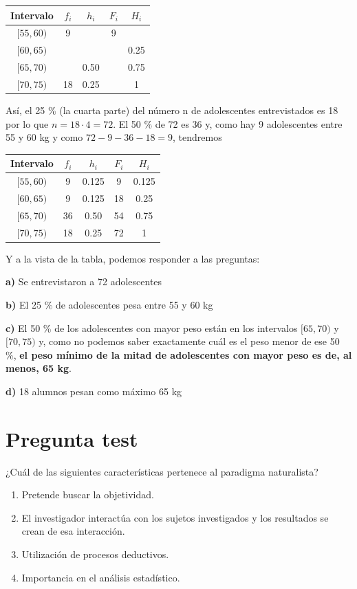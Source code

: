 \documentclass[
]{book}
\providecommand{\tightlist}{%
  \setlength{\itemsep}{0pt}\setlength{\parskip}{0pt}}
\begin{document}
\begin{longtable}[]{@{}ccccc@{}}
\toprule
Intervalo & \(f_i\) & \(h_i\) & \(F_i\) & \(H_i\)\tabularnewline
\midrule
\endhead
\([55,60)\) & 9 & & 9 &\tabularnewline
\([60,65)\) & & & & 0.25\tabularnewline
\([65,70)\) & & 0.50 & & 0.75\tabularnewline
\([70,75)\) & 18 & 0.25 & & 1\tabularnewline
\bottomrule
\end{longtable}

Así, el 25 \% (la cuarta parte) del número n de adolescentes entrevistados es 18 por lo que \(n = 18 \cdot 4 = 72\). El 50 \% de 72 es 36 y, como hay 9 adolescentes entre 55 y 60 kg y como \(72 - 9 - 36 - 18 = 9\), tendremos

\begin{longtable}[]{@{}ccccc@{}}
\toprule
Intervalo & \(f_i\) & \(h_i\) & \(F_i\) & \(H_i\)\tabularnewline
\midrule
\endhead
\([55,60)\) & 9 & 0.125 & 9 & 0.125\tabularnewline
\([60,65)\) & 9 & 0.125 & 18 & 0.25\tabularnewline
\([65,70)\) & 36 & 0.50 & 54 & 0.75\tabularnewline
\([70,75)\) & 18 & 0.25 & 72 & 1\tabularnewline
\bottomrule
\end{longtable}

Y a la vista de la tabla, podemos responder a las preguntas:

\textbf{a)} Se entrevistaron a 72 adolescentes

\textbf{b)} El 25 \% de adolescentes pesa entre 55 y 60 kg

\textbf{c)} El 50 \% de los adolescentes con mayor peso están en los intervalos \([65,70)\) y \([70,75)\) y, como no podemos saber exactamente cuál es el peso menor de ese 50 \%, \textbf{el peso mínimo de la mitad de adolescentes con mayor peso es de, al menos, 65 kg}.

\textbf{d)} 18 alumnos pesan como máximo 65 kg

\hypertarget{pregunta-test-12}{%
\section{Pregunta test}\label{pregunta-test-12}}

¿Cuál de las siguientes características pertenece al paradigma naturalista?

\begin{enumerate}
\def\labelenumi{\alph{enumi})}
\tightlist
\item
  Pretende buscar la objetividad.
\item
  El investigador interactúa con los sujetos investigados y los resultados se crean de esa interacción.
\item
  Utilización de procesos deductivos.
\item
  Importancia en el análisis estadístico.
\end{enumerate}
\end{document}
